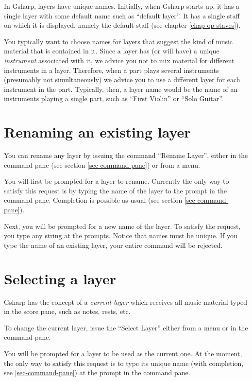\documentclass[11pt]{book}
\def\gs{Gsharp}
\def\command#1{``#1''}
\begin{document}
In {\gs}, layers have unique names.  Initially, when {\gs} starts up,
it has a single layer with some default name such as ``default
layer''. It has a single staff on which it is displayed, namely the
default staff (see chapter \ref{chap-op-staves}).  

You typically want to choose names for layers that suggest the kind of
music material that is contained in it.  Since a layer has (or will
have) a unique \emph{instrument} associated with it,
we advice you not to mix material for different instruments in a
layer.  Therefore, when a part plays several instruments (presumably
not simultaneously) we advice you to use a different layer for each
instrument in the part.  Typically, then, a layer name would be the
name of an instruments playing a single part, such as ``First Violin''
or ``Solo Guitar''.  

\section{Renaming an existing layer}

You can rename any layer by issuing the command \command{Rename
Layer}, either in the command pane (see section
\ref{sec-command-pane}) or from a menu.

You will first be prompted for a layer to rename.  Currently the only
way to satisfy this request is by typing the name of the layer to the
prompt in the command pane. Completion is possible as usual (see
section \ref{sec-command-pane}). 
 
Next, you will be prompted for a new name of the layer.  To satisfy
the request, you type any string at the prompts.  Notice that names
must be unique.  If you type the name of an existing layer, your
entire command will be rejected. 

\section{Selecting a layer}

{\gs} has the concept of a \emph{current layer}
which receives all music material typed in the score pane, such as
notes, rests, etc. 

To change the current layer, issue the \command{Select Layer} either
from a menu or in the command pane.  

You will be prompted for a layer to be used as the current one.  At
the moment, the only way to satisfy this request is to type its unique
name (with completion, see \ref{sec-command-pane}) at the prompt in
the command pane. 
\end{document}
